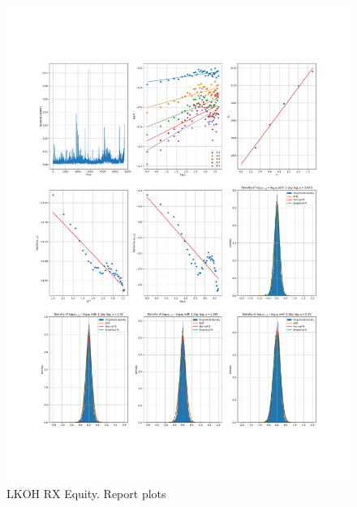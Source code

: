     \begin{figure}[h]
        \centering
        \includegraphics[width=\textwidth]{fig/LKOH RX Equity.pdf}
        \caption{LKOH RX Equity. Report plots}
    \end{figure} 
        
